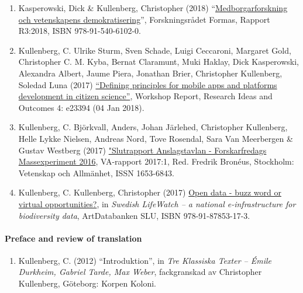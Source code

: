 \documentclass[
]{article}
\providecommand{\tightlist}{%
  \setlength{\itemsep}{0pt}\setlength{\parskip}{0pt}}
\begin{document}
\begin{enumerate}
\def\labelenumi{\arabic{enumi}.}
\tightlist
\item
  Kasperowski, Dick \& Kullenberg, Christopher (2018)
  ``\href{http://www.formas.se/sv/Om-Formas/Formas-Publikationer/Rapporter/Medborgarforskning-och-vetenskapens-demokratisering/}{Medborgarforskning
  och vetenskapens demokratisering}'', Forskningsrådet Formas, Rapport
  R3:2018, ISBN 978-91-540-6102-0.
\item
  Kullenberg, C. Ulrike Sturm, Sven Schade, Luigi Ceccaroni, Margaret
  Gold, Christopher C. M. Kyba, Bernat Claramunt, Muki Haklay, Dick
  Kasperowski, Alexandra Albert, Jaume Piera, Jonathan Brier,
  Christopher Kullenberg, Soledad Luna (2017)
  \href{https://doi.org/10.3897/rio.4.e23394}{``Defining principles for
  mobile apps and platforms development in citizen science''}, Workshop
  Report, Research Ideas and Outcomes 4: e23394 (04 Jan 2018).
\item
  Kullenberg, C. Björkvall, Anders, Johan Järlehed, Christopher
  Kullenberg, Helle Lykke Nielsen, Andreas Nord, Tove Rosendal, Sara Van
  Meerbergen \& Gustav Westberg (2017)
  \href{https://www.forskarfredag.se/filer/ff2016-anslagstavlan-slutrapport.pdf}{"Slutrapport
  Anslagstavlan - Forskarfredags Massexperiment 2016}, VA-rapport
  2017:1, Red. Fredrik Bronéus, Stockholm: Vetenskap och Allmänhet, ISSN
  1653-6843.
\item
  Kullenberg, C. Kullenberg, Christopher (2017)
  \href{http://www.slu.se/globalassets/ew/subw/lifewatch/publikationer/slw-summary-report-web-170622.pdf}{Open
  data - buzz word or virtual opportunities?}, in \emph{Swedish
  LifeWatch -- a national e-infrastructure for biodiversity data},
  ArtDatabanken SLU, ISBN 978-91-87853-17-3.
\end{enumerate}

\hypertarget{preface-and-review-of-translation}{%
\paragraph{Preface and review of
translation}\label{preface-and-review-of-translation}}

\begin{enumerate}
\def\labelenumi{\arabic{enumi}.}
\tightlist
\item
  Kullenberg, C. (2012) ``Introduktion'', in \emph{Tre Klassiska Texter
  -- Émile Durkheim, Gabriel Tarde, Max Weber}, fackgranskad av
  Christopher Kullenberg, Göteborg: Korpen Koloni.
\end{enumerate}
\end{document}
